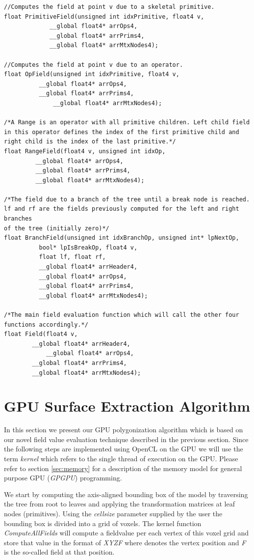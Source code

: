 \begin{lstlisting}[frame=single]
//Computes the field at point v due to a skeletal primitive. 
float PrimitiveField(unsigned int idxPrimitive, float4 v,			
		     __global float4* arrOps4,
		     __global float4* arrPrims4, 
		     __global float4* arrMtxNodes4);

//Computes the field at point v due to an operator.
float OpField(unsigned int idxPrimitive, float4 v,			
	      __global float4* arrOps4,
	      __global float4* arrPrims4, 
              __global float4* arrMtxNodes4);

/*A Range is an operator with all primitive children. Left child field 
in this operator defines the index of the first primitive child and 
right child is the index of the last primitive.*/
float RangeField(float4 v, unsigned int idxOp, 						
		 __global float4* arrOps4,
		 __global float4* arrPrims4, 
		 __global float4* arrMtxNodes4);

/*The field due to a branch of the tree until a break node is reached. 
lf and rf are the fields previously computed for the left and right branches 
of the tree (initially zero)*/
float BranchField(unsigned int idxBranchOp, unsigned int* lpNextOp, 
		  bool* lpIsBreakOp, float4 v, 
		  float lf, float rf,
		  __global float4* arrHeader4,
		  __global float4* arrOps4,
		  __global float4* arrPrims4, 
		  __global float4* arrMtxNodes4);
		  
/*The main field evaluation function which will call the other four functions accordingly.*/
float Field(float4 v,			
	    __global float4* arrHeader4,
            __global float4* arrOps4,
	    __global float4* arrPrims4, 
	    __global float4* arrMtxNodes4);
\end{lstlisting}


\section{GPU Surface Extraction Algorithm}
\label{sec:surfextraction}
In this section we present our GPU polygonization algorithm which is based on our novel field value evaluation technique described
in the previous section. Since the following steps are implemented using OpenCL on the GPU we will use the term \textit{kernel} which 
refers to the single thread of execution on the GPU. Please refer to section \ref{sec:memory} for a description of the memory model for
general purpose GPU (\textit{GPGPU}) programming.

We start by computing the axis-aligned bounding box of the model by traversing the tree from root to leaves 
and applying the transformation matrices at leaf nodes (primitives). Using the \textit{cellsize} parameter supplied by the user the 
bounding box is divided into a grid of voxels. The kernel function \textit{ComputeAllFields} will compute a fieldvalue per each
vertex of this voxel grid and store that value in the format of \textit{XYZF} where  denotes the vertex position and 
\textit{F} is the so-called field at that position. 


